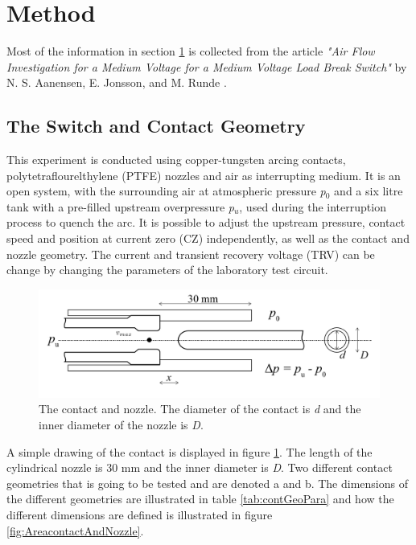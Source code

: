 \documentclass[10pt,a4paper]{article}
\begin{document}
\newpage

\section{Method} \label{sec:Method}
Most of the information in section \ref{sec:Method} is collected from the article \textit{ "Air Flow Investigation for a Medium Voltage for a Medium Voltage Load Break Switch"} by N. S. Aanensen, E. Jonsson, and M. Runde \cite{bib:AFIMVLBA}.
\newline

\subsection{The Switch and Contact Geometry} \label{sec:switchAndContactGeo}
This experiment is conducted using copper-tungsten arcing contacts, polytetraflourelthylene (PTFE) nozzles and air as interrupting medium. It is an open system, with the surrounding air at atmospheric pressure \textit{p$_0$} and a six litre tank with a pre-filled upstream overpressure \textit{p$_u$}, used during the interruption process to quench the arc. It is possible to adjust the upstream pressure, contact speed and position at current zero (CZ) independently, as well as the contact and nozzle geometry. The current and transient recovery voltage (TRV) can be change by changing the parameters of the laboratory test circuit.

\begin{figure} [h]
\centering
\includegraphics[scale=0.3]{Bilder/Method/contactSetUpVmax2.png}
\caption{The contact and nozzle. The diameter of the contact is \textit{d} and the inner diameter of the nozzle is \textit{D}.} \label{fig:contactAndNozzle}
\end{figure}


A simple drawing of the contact is displayed in figure \ref{fig:contactAndNozzle}. The length of the cylindrical nozzle is 30 mm and the inner diameter is \textit{D}. Two different contact geometries that is going to be tested and are denoted a and b. The dimensions of the different geometries are illustrated in table \ref{tab:contGeoPara} and how the different dimensions are defined is illustrated in figure \ref{fig:AreacontactAndNozzle}.
\end{document}
